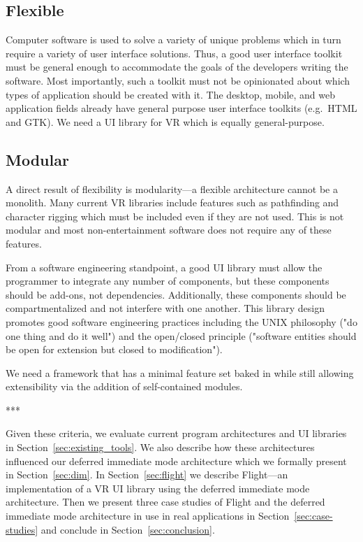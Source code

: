 \documentclass[conference,12pt]{IEEEtran}
\begin{document}
\subsection{Flexible}\label{sec:flexible}
Computer software is used to solve a variety of unique problems which in turn
require a variety of user interface solutions. Thus, a good user interface
toolkit must be general enough to accommodate the goals of the developers
writing the software. Most importantly, such a toolkit must not be opinionated
about which types of application should be created with it. The desktop, mobile,
and web application fields already have general purpose user interface toolkits
(e.g.\ HTML and GTK). We need a UI library for VR which is equally
general-purpose.

\subsection{Modular}\label{sec:modular}
A direct result of flexibility is modularity---a flexible architecture cannot be
a monolith. Many current VR libraries include features such as pathfinding and
character rigging which must be included even if they are not used. This is not
modular and most non-entertainment software does not require any of these
features.

From a software engineering standpoint, a good UI library must allow the
programmer to integrate any number of components, but these components should
be add-ons, not dependencies. Additionally, these components should be
compartmentalized and not interfere with one another. This library design
promotes good software engineering practices including the UNIX philosophy ("do
one thing and do it well") and the open/closed principle ("software entities
should be open for extension but closed to modification").

We need a framework that has a minimal feature set baked in while still allowing
extensibility via the addition of self-contained modules.

\begin{center}***\end{center}

Given these criteria, we evaluate current program architectures and UI libraries
in Section~\ref{sec:existing_tools}. We also describe how these architectures
influenced our deferred immediate mode architecture which we formally present in
Section~\ref{sec:dim}. In Section~\ref{sec:flight} we describe Flight---an
implementation of a VR UI library using the deferred immediate mode
architecture. Then we present three case studies of Flight and the deferred
immediate mode architecture in use in real applications in
Section~\ref{sec:case-studies} and conclude in Section~\ref{sec:conclusion}.
\end{document}
